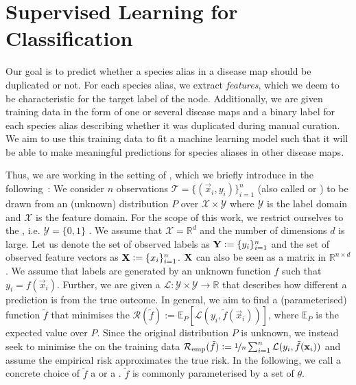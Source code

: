 \documentclass[
	fontsize=10pt, %
	twoside=false, %
	secnumdepth=1, %
  toc=indentunnumbered %
]{kaobook}
\begin{document}
\section{Supervised Learning for Classification}
\label{sec:supervised-learning}
Our goal is to predict whether a species alias in a disease map
should be duplicated or not. For each species alias, we extract 
\textit{features}, which we deem to be characteristic for the target label of
the node.
Additionally, we are given training
data in the form of one or several disease maps and a binary label for each
species alias describing whether it was duplicated during manual curation. We
aim to use this training data to fit a machine learning model such that it will
be able to make meaningful predictions for species aliases in other disease
maps.

Thus, we are working in the setting of , which we
briefly introduce in the
following~\cite{vapnik_PrinciplesRiskMinimization_,bronstein_geometric_2021}:
We consider $n$ observations $\mathcal{T} = \{(\vec x_i, y_i)\}_{i=1}^n$ (also
called  or ) to be drawn from an (unknown)
distribution $P$ over $\mathcal{X} \times \mathcal{Y}$ where $\mathcal{Y}$ is
the label domain and $\mathcal{X}$ is the feature domain. For the scope of this
work, we restrict ourselves to the , i.e.
$\mathcal{Y} = \{0,1\}$ . We assume that $\mathcal{X} = \mathbb{R}^d$ and the
number of dimensions $d$ is large. Let us denote the set of
observed  labels as $\mat Y := \{y_i\}_{i=1}^n$ and the set of
observed feature vectors as $\mat X := \{x_i\}_{i=1}^n$. $\mat X$ can also be
seen as a matrix in $\mathbb{R}^{n \times d}$.
%
We assume that labels are generated by an unknown function $f$ such that $y_i
= f(\vec x_i)$.
%
Further, we are given a  $\mathcal{L} :
\mathcal{Y} \times \mathcal{Y} \rightarrow \mathbb{R}$ that describes how
different a prediction is from the true outcome.
%
In general, we aim to find a (parameterised) function $\tilde f$ that minimises
the  $\mathcal{R}(\tilde f) := \mathbb{E}_P\left[ \mathcal{L}(y_i,
    \tilde f(\vec x_i)) \right]$, where $\mathbb{E}_P$ is the expected value
over $P$.
%
Since the original distribution $P$ is unknown, we instead seek to minimise the 
  on the training data
$\mathcal{R}_{\text{emp}}(\tilde f) := \nicefrac{1}{n}
\sum_{i=1}^n \mathcal{L}(y_i, \tilde f(\vec x_i))$ and assume the empirical risk
approximates the true risk.
%
In the following, we call a concrete choice of $\tilde f$ a  or a
. $\tilde f$ is commonly parameterised by a set of 
$\theta$.
\end{document}
